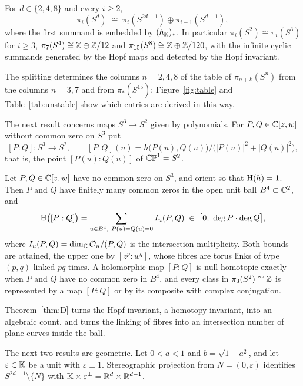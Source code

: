 \begin{maintheorem}[Splitting]\label{thm:C}
For $d\in\{2,4,8\}$ and every $i\ge2$,
\[
\pi_i(S^d)\;\cong\;\pi_i(S^{2d-1})\oplus\pi_{i-1}(S^{d-1}),
\]
where the first summand is embedded by $(h_{\mathbb{K}})_*$. In particular $\pi_i(S^2)\cong\pi_i(S^3)$ for $i\ge3$, $\pi_7(S^4)\cong\mathbb{Z}\oplus\mathbb{Z}/12$ and $\pi_{15}(S^8)\cong\mathbb{Z}\oplus\mathbb{Z}/120$, with the infinite cyclic summands generated by the Hopf maps and detected by the Hopf invariant.
\end{maintheorem}

The splitting determines the columns $n=2,4,8$ of the table of $\pi_{n+k}(S^n)$ from the columns $n=3,7$ and from $\pi_*(S^{15})$; Figure~\ref{fig:table} and Table~\ref{tab:unstable} show which entries are derived in this way.

The next result concerns maps $S^3\to S^2$ given by polynomials. For $P,Q\in\mathbb{C}[z,w]$ without common zero on $S^3$ put
\[
[P:Q]\colon S^3\to S^2,\qquad [P:Q](u)=h\bigl(P(u),Q(u)\bigr)\big/\bigl(|P(u)|^2+|Q(u)|^2\bigr),
\]
that is, the point $[P(u):Q(u)]$ of $\mathbb{CP}^1=S^2$.

\begin{maintheorem}\label{thm:D}
Let $P,Q\in\mathbb{C}[z,w]$ have no common zero on $S^3$, and orient so that $\mathrm{H}(h)=1$. Then $P$ and $Q$ have finitely many common zeros in the open unit ball $B^4\subset\mathbb{C}^2$, and
\[
\Hopf\bigl([P:Q]\bigr)=\sum_{u\in B^4,\ P(u)=Q(u)=0} I_u(P,Q)\;\in\;\bigl[0,\ \deg P\cdot\deg Q\bigr],
\]
where $I_u(P,Q)=\dim_{\mathbb{C}}\mathcal O_u/(P,Q)$ is the intersection multiplicity. Both bounds are attained, the upper one by $[z^p:w^q]$, whose fibres are torus links of type $(p,q)$ linked $pq$ times. A holomorphic map $[P:Q]$ is null-homotopic exactly when $P$ and $Q$ have no common zero in $B^4$, and every class in $\pi_3(S^2)\cong\mathbb{Z}$ is represented by a map $[P:Q]$ or by its composite with complex conjugation.
\end{maintheorem}

Theorem~\ref{thm:D} turns the Hopf invariant, a homotopy invariant, into an algebraic count, and turns the linking of fibres into an intersection number of plane curves inside the ball.

The next two results are geometric. Let $0<a<1$ and $b=\sqrt{1-a^2}$, and let $\varepsilon\in\mathbb{K}$ be a unit with $\varepsilon\perp1$. Stereographic projection from $N=(0,\varepsilon)$ identifies $S^{2d-1}\setminus\{N\}$ with $\mathbb{K}\times\varepsilon^\perp=\mathbb{R}^d\times\mathbb{R}^{d-1}$.

